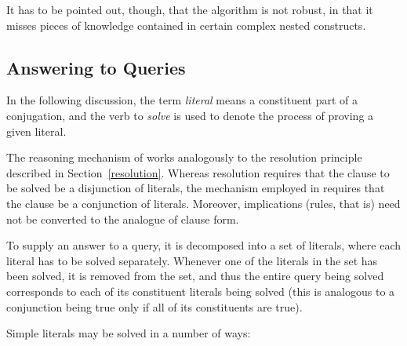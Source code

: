 It has to be pointed out, though, that the algorithm
is not robust, in that it misses pieces of knowledge contained in
certain complex nested constructs. 

\subsection{Answering to Queries}
\label{answer}

In the following discussion, the term {\em literal\/} means a
constituent part of a conjugation, and the verb to {\em solve\/} is
used to denote the process of proving a given literal.

The reasoning mechanism of {\nash} works analogously to the resolution
principle described in Section~\ref{resolution}. Whereas resolution
requires that the clause to be solved be a disjunction of literals,
the mechanism employed in {\nash} requires that the clause be a
conjunction of literals. Moreover, implications (rules, that is) need
not be converted to the analogue of clause form.

To supply an answer to a query, it is decomposed into a set of
literals, where each literal has to be solved separately.  Whenever
one of the literals in the set has been solved, it is removed from the
set, and thus the entire query being solved corresponds to each of its
constituent literals being solved (this is analogous to a conjunction
being true only if all of its constituents are true).

Simple literals may be solved in a number of ways:

